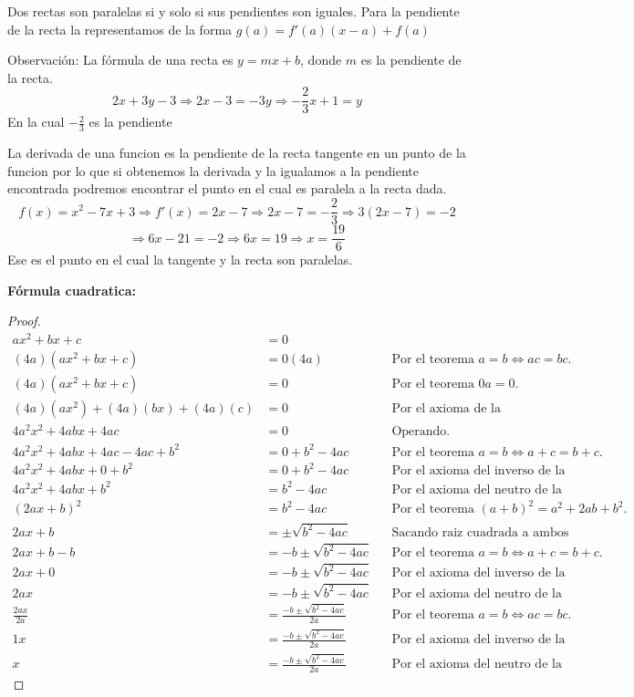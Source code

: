 \documentclass[12pt]{article}
\begin{document}
\begin{enumerate}[\hspace{9px} a)]
    Dos rectas son paralelas si y solo si sus pendientes son iguales. Para la pendiente de la recta la representamos de la forma \(g(a) = f'(a)(x-a)+f(a)\)\medskip

    Observación: La f\'ormula de una recta es \(y=mx+b\), donde $m$ es la pendiente de la recta.
    \[2x+3y-3\Rightarrow 2x-3=-3y\Rightarrow -\displaystyle\frac{2}{3}x+1=y\]
    En la cual \(-\displaystyle\frac{2}{3}\) es la pendiente\medskip

    La derivada de una funcion es la pendiente de la recta tangente en un punto de la funcion por lo que si obtenemos la derivada y la igualamos a la pendiente encontrada podremos encontrar el punto en el cual es paralela a la recta dada.
    \[f(x)=x^2-7x+3\Rightarrow f'(x)=2x-7\Rightarrow 2x-7=-\displaystyle\frac{2}{3}\Rightarrow 3(2x-7)=-2\]
    \[\Rightarrow 6x-21=-2\Rightarrow 6x=19\Rightarrow x=\displaystyle\frac{19}{6}\]
     Ese es el punto en el cual la tangente y la recta son paralelas.
\end{enumerate}

\vfill

\textbf{F\'ormula cuadratica:}
\begin{proof}
\begin{align*}
    ax^2+bx+c&=0\\
    (4a)(ax^2+bx+c)&=0(4a) \quad &&\text{Por el teorema $a=b \iff ac=bc$.}\\
    (4a)(ax^2+bx+c)&=0 &&\text{Por el teorema $0a=0$.}\\
    (4a)(ax^2)+(4a)(bx)+(4a)(c)&=0 &&\text{Por el axioma de la distributividad.}\\
    4a^2x^2+4abx+4ac&=0 &&\text{Operando.}\\
    4a^2x^2+4abx+4ac-4ac+b^2&=0+b^2-4ac &&\text{Por el teorema $a=b \iff a+c=b+c$.}\\
    4a^2x^2+4abx+0+b^2&=0+b^2-4ac &&\text{Por el axioma del inverso de la suma.}\\
    4a^2x^2+4abx+b^2&=b^2-4ac &&\text{Por el axioma del neutro de la suma.}\\
    (2ax+b)^2&=b^2-4ac &&\text{Por el teorema $(a+b)^2=a^2+2ab+b^2$.}\\
    2ax+b&=\pm \sqrt{b^2-4ac} &&\text{Sacando raiz cuadrada a ambos lados.}\\
    2ax+b-b&=-b \pm \sqrt{b^2-4ac} &&\text{Por el teorema $a=b \iff a+c=b+c$.}\\
    2ax+0&=-b \pm \sqrt{b^2-4ac} &&\text{Por el axioma del inverso de la suma.}\\
    2ax&=-b \pm \sqrt{b^2-4ac} &&\text{Por el axioma del neutro de la suma.}\\
    \frac{2ax}{2a}&=\frac{-b\pm \sqrt{b^2-4ac}}{2a} &&\text{Por el teorema $a=b \iff ac=bc$.}\\
    1x&=\frac{-b\pm \sqrt{b^2-4ac}}{2a} &&\text{Por el axioma del inverso de la multiplicación.}\\
    x&=\frac{-b\pm \sqrt{b^2-4ac}}{2a} &&\text{Por el axioma del neutro de la multiplicación.}
\end{align*}
\end{proof}
\end{document}
